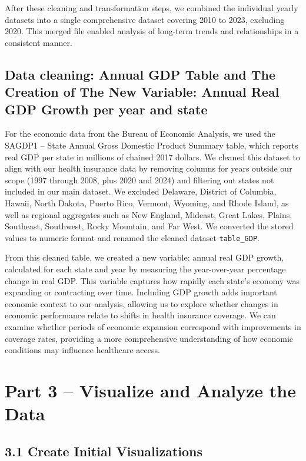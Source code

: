 \documentclass[
]{article}
\begin{document}
After these cleaning and transformation steps, we combined the
individual yearly datasets into a single comprehensive dataset covering
2010 to 2023, excluding 2020. This merged file enabled analysis of
long-term trends and relationships in a consistent manner.

\subsection{Data cleaning: Annual GDP Table and The Creation of The New
Variable: Annual Real GDP Growth per year and
state}\label{data-cleaning-annual-gdp-table-and-the-creation-of-the-new-variable-annual-real-gdp-growth-per-year-and-state}

For the economic data from the Bureau of Economic Analysis, we used the
SAGDP1 -- State Annual Gross Domestic Product Summary table, which
reports real GDP per state in millions of chained 2017 dollars. We
cleaned this dataset to align with our health insurance data by removing
columns for years outside our scope (1997 through 2008, plus 2020 and
2024) and filtering out states not included in our main dataset. We
excluded Delaware, District of Columbia, Hawaii, North Dakota, Puerto
Rico, Vermont, Wyoming, and Rhode Island, as well as regional aggregates
such as New England, Mideast, Great Lakes, Plains, Southeast, Southwest,
Rocky Mountain, and Far West. We converted the stored values to numeric
format and renamed the cleaned dataset \texttt{table\_GDP}.

From this cleaned table, we created a new variable: annual real GDP
growth, calculated for each state and year by measuring the
year-over-year percentage change in real GDP. This variable captures how
rapidly each state's economy was expanding or contracting over time.
Including GDP growth adds important economic context to our analysis,
allowing us to explore whether changes in economic performance relate to
shifts in health insurance coverage. We can examine whether periods of
economic expansion correspond with improvements in coverage rates,
providing a more comprehensive understanding of how economic conditions
may influence healthcare access.

\section{Part 3 -- Visualize and Analyze the
Data}\label{part-3-visualize-and-analyze-the-data}

\subsection{3.1 Create Initial
Visualizations}\label{create-initial-visualizations}
\end{document}
